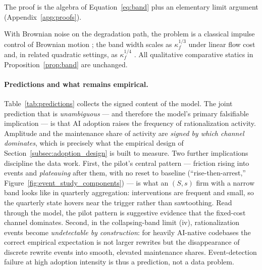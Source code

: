 \noindent The proof is the algebra of Equation~\eqref{eq:band} plus an
elementary limit argument (Appendix~\ref{app:proofs}).

\begin{remark}
\label{rem:stochastic}
With Brownian noise on the degradation path, the problem is a classical
impulse control of Brownian motion \citep{harrison1983}; the band width
scales as $\kappa_f^{1/3}$ under linear flow cost and, in related quadratic
settings, as $\kappa_f^{1/4}$ \citep{dixit1991}. All qualitative
comparative statics in Proposition~\ref{prop:band} are unchanged.
\end{remark}

\paragraph{Predictions and what remains empirical.}
Table~\ref{tab:predictions} collects the signed content of the model.
The joint prediction that is \emph{unambiguous} --- and therefore the
model's primary falsifiable implication --- is that AI adoption raises the
frequency of rationalization activity. Amplitude and the maintenance share
of activity are \emph{signed by which channel dominates}, which is
precisely what the empirical design of
Section~\ref{subsec:adoption_design} is built to measure. Two further
implications discipline the data work. First, the pilot's central pattern
--- friction rising into events and \emph{plateauing} after them, with no
reset to baseline (``rise-then-arrest,''
Figure~\ref{fig:event_study_components}) --- is what an $(S,s)$ firm with
a narrow band looks like in quarterly aggregation: interventions are
frequent and small, so the quarterly state hovers near the trigger rather
than sawtoothing. Read through the model, the pilot pattern is suggestive
evidence that the fixed-cost channel dominates. Second, in the
collapsing-band limit (iv), rationalization events become
\emph{undetectable by construction}: for heavily AI-native codebases the
correct empirical expectation is not larger rewrites but the
disappearance of discrete rewrite events into smooth, elevated
maintenance shares. Event-detection failure at high adoption intensity is
thus a prediction, not a data problem.

